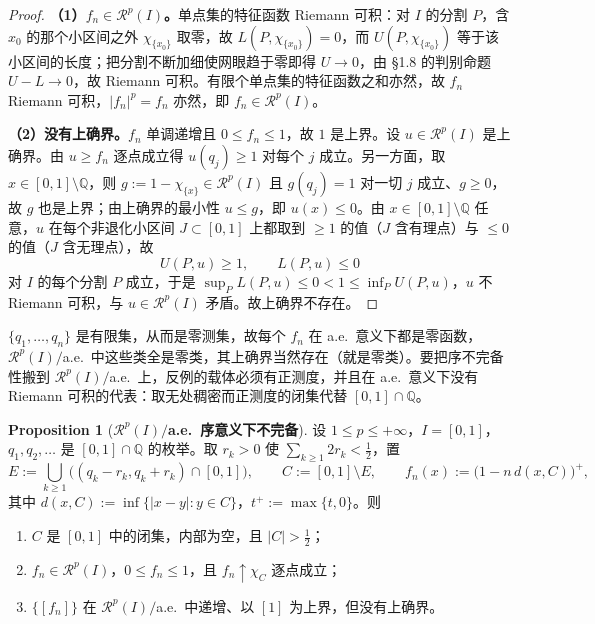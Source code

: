 \documentclass[oneside]{book}
\theoremstyle{definition}
\newcommand{\Rc}{\mathcal{R}}
\providecommand{\Q}{\mathbb{Q}}
\theoremstyle{definition}
\newtheorem{proposition}{Proposition}[section]
\begin{document}
	\begin{proof}
		\textbf{（1）$f_n\in\Rc^p(I)$。}单点集的特征函数 Riemann 可积：对 $I$ 的分割 $P$，含 $x_0$ 的那个小区间之外 $\chi_{\{x_0\}}$ 取零，故 $L(P,\chi_{\{x_0\}})=0$，而 $U(P,\chi_{\{x_0\}})$ 等于该小区间的长度；把分割不断加细使网眼趋于零即得 $U\to0$，由 §1.8 的判别命题 $U-L\to0$，故 Riemann 可积。有限个单点集的特征函数之和亦然，故 $f_n$ Riemann 可积，$|f_n|^p=f_n$ 亦然，即 $f_n\in\Rc^p(I)$。
		
		\textbf{（2）没有上确界。}$f_n$ 单调递增且 $0\leqslant f_n\leqslant1$，故 $1$ 是上界。设 $u\in\Rc^p(I)$ 是上确界。由 $u\geqslant f_n$ 逐点成立得 $u(q_j)\geqslant1$ 对每个 $j$ 成立。另一方面，取 $x\in[0,1]\setminus\Q$，则 $g:=1-\chi_{\{x\}}\in\Rc^p(I)$ 且 $g(q_j)=1$ 对一切 $j$ 成立、$g\geqslant0$，故 $g$ 也是上界；由上确界的最小性 $u\leqslant g$，即 $u(x)\leqslant0$。由 $x\in[0,1]\setminus\Q$ 任意，$u$ 在每个非退化小区间 $J\subset[0,1]$ 上都取到 $\geqslant1$ 的值（$J$ 含有理点）与 $\leqslant0$ 的值（$J$ 含无理点），故
		\[
		U(P,u)\geqslant1,\qquad L(P,u)\leqslant0
		\]
		对 $I$ 的每个分割 $P$ 成立，于是 $\sup_PL(P,u)\leqslant0<1\leqslant\inf_PU(P,u)$，$u$ 不 Riemann 可积，与 $u\in\Rc^p(I)$ 矛盾。故上确界不存在。
	\end{proof}
	
	\begin{note}
		$\{q_1,\dots,q_n\}$ 是有限集，从而是零测集，故每个 $f_n$ 在 a.e.\ 意义下都是零函数，$\Rc^p(I)/$a.e.\ 中这些类全是零类，其上确界当然存在（就是零类）。要把序不完备性搬到 $\Rc^p(I)/$a.e.\ 上，反例的载体必须有正测度，并且在 a.e.\ 意义下没有 Riemann 可积的代表：取无处稠密而正测度的闭集代替 $[0,1]\cap\Q$。
	\end{note}
	
	\begin{proposition}[\bfseries{$\Rc^p(I)/$a.e.\ 序意义下不完备}]
		设 $1\leqslant p\leqslant+\infty$，$I=[0,1]$，$q_1,q_2,\dots$ 是 $[0,1]\cap\Q$ 的枚举。取 $r_k>0$ 使 $\sum_{k\geqslant1}2r_k<\frac12$，置
		\[
		E:=\bigcup_{k\geqslant1}\bigl((q_k-r_k,q_k+r_k)\cap[0,1]\bigr),\qquad
		C:=[0,1]\setminus E,\qquad
		f_n(x):=\bigl(1-n\,d(x,C)\bigr)^+,
		\]
		其中 $d(x,C):=\inf\{|x-y|:y\in C\}$，$t^+:=\max\{t,0\}$。则
		\begin{enumerate}[leftmargin=2.4em]
			\item $C$ 是 $[0,1]$ 中的闭集，内部为空，且 $|C|>\frac12$；
			\item $f_n\in\Rc^p(I)$，$0\leqslant f_n\leqslant1$，且 $f_n\uparrow\chi_C$ 逐点成立；
			\item $\{[f_n]\}$ 在 $\Rc^p(I)/$a.e.\ 中递增、以 $[1]$ 为上界，但没有上确界。
		\end{enumerate}
	\end{proposition}
	
\end{document}
